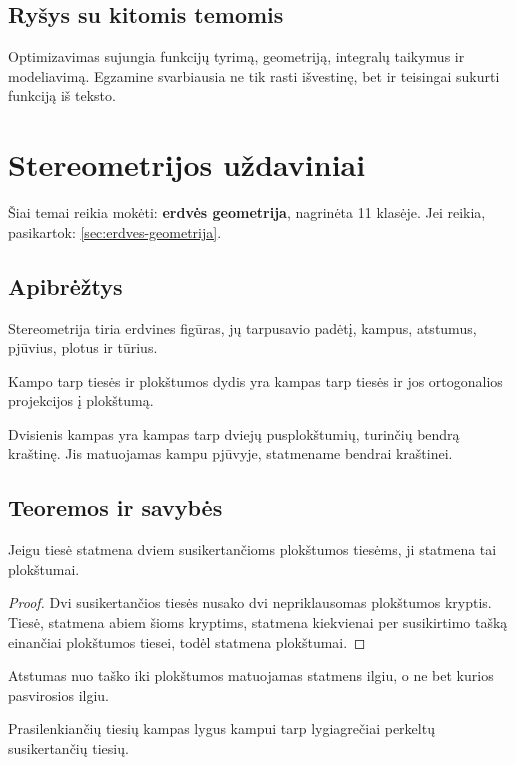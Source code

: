 \subsection{Ryšys su kitomis temomis}
Optimizavimas sujungia funkcijų tyrimą, geometriją, integralų taikymus ir modeliavimą. Egzamine svarbiausia ne tik rasti išvestinę, bet ir teisingai sukurti funkciją iš teksto.

\section{Stereometrijos uždaviniai}\label{sec:stereometrijos-uzdaviniai}

\begin{tcolorbox}[title=Primename iš ankstesnių klasių, colback=yellow!10]
Šiai temai reikia mokėti: \textbf{erdvės geometrija}, nagrinėta 11 klasėje.
Jei reikia, pasikartok: \ref{sec:erdves-geometrija}.
\end{tcolorbox}

\subsection{Apibrėžtys}
\begin{apibreztis}
Stereometrija tiria erdvines figūras, jų tarpusavio padėtį, kampus, atstumus, pjūvius, plotus ir tūrius.
\end{apibreztis}
\begin{apibreztis}
Kampo tarp tiesės ir plokštumos dydis yra kampas tarp tiesės ir jos ortogonalios projekcijos į plokštumą.
\end{apibreztis}
\begin{apibreztis}
Dvisienis kampas yra kampas tarp dviejų pusplokštumių, turinčių bendrą kraštinę. Jis matuojamas kampu pjūvyje, statmename bendrai kraštinei.
\end{apibreztis}

\subsection{Teoremos ir savybės}
\begin{teorema}
Jeigu tiesė statmena dviem susikertančioms plokštumos tiesėms, ji statmena tai plokštumai.
\end{teorema}
\begin{proof}
Dvi susikertančios tiesės nusako dvi nepriklausomas plokštumos kryptis. Tiesė, statmena abiem šioms kryptims, statmena kiekvienai per susikirtimo tašką einančiai plokštumos tiesei, todėl statmena plokštumai.
\end{proof}
\begin{savybe}
Atstumas nuo taško iki plokštumos matuojamas statmens ilgiu, o ne bet kurios pasvirosios ilgiu.
\end{savybe}
\begin{savybe}
Prasilenkiančių tiesių kampas lygus kampui tarp lygiagrečiai perkeltų susikertančių tiesių.
\end{savybe}

